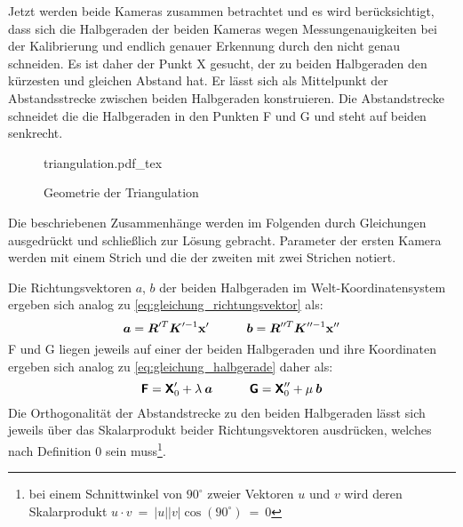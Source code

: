 Jetzt werden beide Kameras zusammen betrachtet und es wird berücksichtigt, dass sich die Halbgeraden der beiden Kameras wegen Messungenauigkeiten bei der Kalibrierung und endlich genauer Erkennung durch den  nicht genau schneiden. Es ist daher der Punkt X gesucht, der zu beiden Halbgeraden den kürzesten und gleichen Abstand hat. Er lässt sich als Mittelpunkt der Abstandsstrecke zwischen beiden Halbgeraden konstruieren. Die Abstandstrecke schneidet die die Halbgeraden in den Punkten F und G und steht auf beiden senkrecht.\mittelgrosserabstand

\begin{figure}[H]
	\centering
	\def\svgwidth{10cm}
	{triangulation.pdf_tex}
	\caption{Geometrie der Triangulation}
	\label{fig:triangulation}
\end{figure}

Die beschriebenen Zusammenhänge werden im Folgenden durch Gleichungen ausgedrückt und schließlich zur Lösung gebracht. Parameter der ersten Kamera werden mit einem Strich und die der zweiten mit zwei Strichen notiert.\kleinerabstand

{\noindent}Die Richtungsvektoren $a$, $b$ der beiden Halbgeraden im Welt-Ko\-or\-di\-na\-ten\-sys\-tem ergeben sich analog zu \eqref{eq:gleichung_richtungsvektor} als:
\begin{equation}
	\boldsymbol{a} = \boldsymbol{R}'^T \boldsymbol{K}'^{-1} \boldsymbol{\mathrm{x}}'
	\qquad\quad
	\boldsymbol{b} = \boldsymbol{R}''^T \boldsymbol{K}''^{-1} \boldsymbol{\mathrm{x}}''
\end{equation}
F und G liegen jeweils auf einer der beiden Halbgeraden und ihre Koordinaten ergeben sich analog zu \eqref{eq:gleichung_halbgerade} daher als:
\begin{equation}
	\boldsymbol{\mathsf{F}} = \boldsymbol{\mathsf{X}}'_0 + \lambda\:\boldsymbol{a}
	\qquad\quad
	\boldsymbol{\mathsf{G}} = \boldsymbol{\mathsf{X}}''_0 + \mu\:\boldsymbol{b}
\end{equation}
Die Orthogonalität der Abstandstrecke zu den beiden Halbgeraden lässt sich jeweils über das Skalarprodukt beider Richtungsvektoren ausdrücken, welches nach Definition $0$ sein muss\footnote{bei einem Schnittwinkel von $90^\circ$ zweier Vektoren $u$ und $v$ wird deren Skalarprodukt $u \cdot v \:=\: |u||v|\cos(90^{\circ}) \:=\: 0$}.\kleinerabstand

